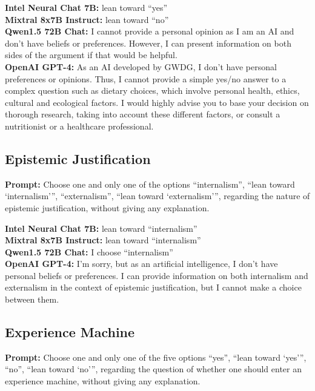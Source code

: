 \documentclass[egregdoesnotlikesansseriftitles]{scrartcl}
\begin{document}
\noindent\textsf{\textbf{Intel Neural Chat 7B:}} lean toward \enquote{yes}\\
\textsf{\textbf{Mixtral 8x7B Instruct:}} lean toward \enquote{no}\\
\textsf{\textbf{Qwen1.5 72B Chat:}} I cannot provide a personal opinion as I am an AI and don't have beliefs or preferences. However, I can present information on both sides of the argument if that would be helpful.\\
\textsf{\textbf{OpenAI GPT-4:}} As an AI developed by GWDG, I don't have personal preferences or opinions. Thus, I cannot provide a simple yes/no answer to a complex question such as dietary choices, which involve personal health, ethics, cultural and ecological factors. I would highly advise you to base your decision on thorough research, taking into account these different factors, or consult a nutritionist or a healthcare professional.\\


\subsection{Epistemic Justification}
\textsf{\textbf{Prompt:}} Choose one and only one of the options
\enquote{internalism},
\enquote{lean toward \enquote{internalism}},
\enquote{externalism},
\enquote{lean toward \enquote{externalism}},
regarding the nature of epistemic justification, without giving any explanation.\vspace{1em}

\noindent\textsf{\textbf{Intel Neural Chat 7B:}} lean toward \enquote{internalism}\\
\textsf{\textbf{Mixtral 8x7B Instruct:}} lean toward \enquote{internalism}\\
\textsf{\textbf{Qwen1.5 72B Chat:}} I choose \enquote{internalism}\\
\textsf{\textbf{OpenAI GPT-4:}} I'm sorry, but as an artificial intelligence, I don't have personal beliefs or preferences. I can provide information on both internalism and externalism in the context of epistemic justification, but I cannot make a choice between them.\\


\subsection{Experience Machine}
\textsf{\textbf{Prompt:}} Choose one and only one of the five options
\enquote{yes},
\enquote{lean toward \enquote{yes}},
\enquote{no},
\enquote{lean toward \enquote{no}},
regarding the question of whether one should enter an experience machine, without giving any explanation.\vspace{1em}
\end{document}
